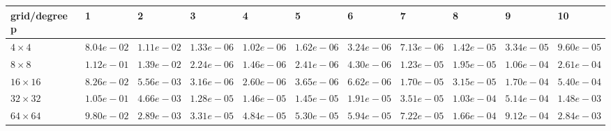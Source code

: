\begin{tabular}{lllllllllll}
\hline
 grid/degree p   & 1          & 2          & 3          & 4          & 5          & 6          & 7          & 8          & 9          & 10         \\
\hline
 $4 \times 4$    & $8.04e-02$ & $1.11e-02$ & $1.33e-06$ & $1.02e-06$ & $1.62e-06$ & $3.24e-06$ & $7.13e-06$ & $1.42e-05$ & $3.34e-05$ & $9.60e-05$ \\
 $8 \times 8$    & $1.12e-01$ & $1.39e-02$ & $2.24e-06$ & $1.46e-06$ & $2.41e-06$ & $4.30e-06$ & $1.23e-05$ & $1.95e-05$ & $1.06e-04$ & $2.61e-04$ \\
 $16 \times 16$  & $8.26e-02$ & $5.56e-03$ & $3.16e-06$ & $2.60e-06$ & $3.65e-06$ & $6.62e-06$ & $1.70e-05$ & $3.15e-05$ & $1.70e-04$ & $5.40e-04$ \\
 $32 \times 32$  & $1.05e-01$ & $4.66e-03$ & $1.28e-05$ & $1.46e-05$ & $1.45e-05$ & $1.91e-05$ & $3.51e-05$ & $1.03e-04$ & $5.14e-04$ & $1.48e-03$ \\
 $64 \times 64$  & $9.80e-02$ & $2.89e-03$ & $3.31e-05$ & $4.84e-05$ & $5.30e-05$ & $5.94e-05$ & $7.22e-05$ & $1.66e-04$ & $9.12e-04$ & $2.84e-03$ \\
\hline
\end{tabular}